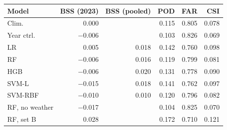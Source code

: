 \begin{tabular}{lrrrrr}
\toprule
Model & BSS (2023) & BSS (pooled) & POD & FAR & CSI \\
\midrule
Clim. & 0.000 & & 0.115 & 0.805 & 0.078 \\
Year ctrl. & $-$0.006 & & 0.103 & 0.826 & 0.069 \\
\midrule
LR & 0.005 & 0.018 & 0.142 & 0.760 & 0.098 \\
RF & $-$0.006 & 0.016 & 0.119 & 0.799 & 0.081 \\
HGB & $-$0.006 & 0.020 & 0.131 & 0.778 & 0.090 \\
SVM-L & $-$0.015 & 0.018 & 0.141 & 0.762 & 0.097 \\
SVM-RBF & $-$0.010 & 0.010 & 0.120 & 0.796 & 0.082 \\
\midrule
RF, no weather & $-$0.017 & & 0.104 & 0.825 & 0.070 \\
RF, set B & 0.028 & & 0.172 & 0.710 & 0.121 \\
\bottomrule
\end{tabular}
